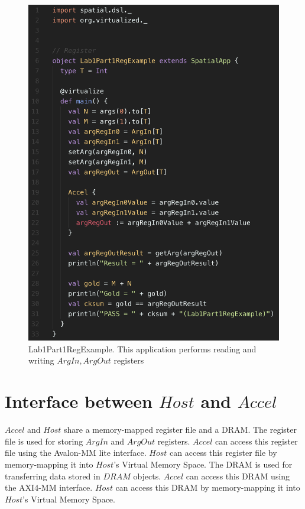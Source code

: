 \documentclass{article}
\begin{document}
    \begin{figure}
    \centering
    \includegraphics[scale=0.6]{regexample.png}
    \caption{Lab1Part1RegExample. This application performs reading and writing $ArgIn, ArgOut$ registers}
    \label{fig:arginout}
    \end{figure}
    
    \section{Interface between $Host$ and $Accel$}
    $Accel$ and $Host$ share a memory-mapped register file and a DRAM.
    The register file is used for storing $ArgIn$ and $ArgOut$ registers.
    $Accel$ can access this register file using the Avalon-MM lite interface.
    $Host$ can access this register file by memory-mapping it into $Host$'s Virtual Memory Space.
    The DRAM is used for transferring data stored in $DRAM$ objects.
    $Accel$ can access this DRAM using the AXI4-MM interface.
    $Host$ can access this DRAM by memory-mapping it into $Host$'s Virtual Memory Space.
    
\end{document}
